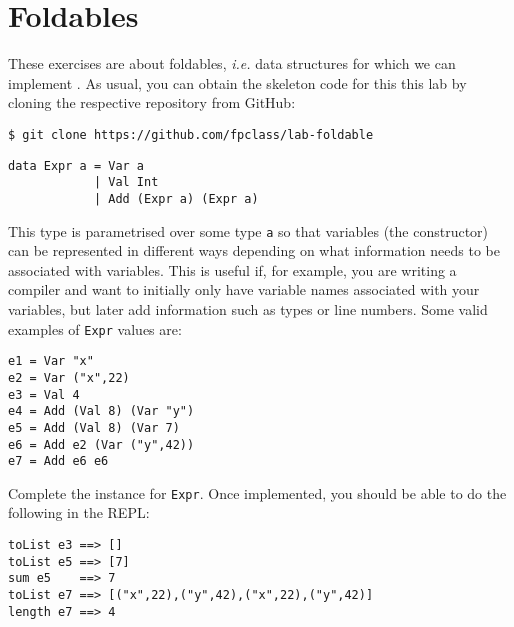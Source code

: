 \section{Foldables}

These exercises are about foldables, \emph{i.e.} data structures for which we can implement . As usual, you can obtain the skeleton code for this this lab by cloning the respective repository from GitHub:
\begin{verbatim}
$ git clone https://github.com/fpclass/lab-foldable
\end{verbatim}

\taskLine 

\begin{verbatim}
data Expr a = Var a
            | Val Int
            | Add (Expr a) (Expr a)
\end{verbatim}
This type is parametrised over some type \texttt{\small a} so that variables (the  constructor) can be represented in different ways depending on what information needs to be associated with variables. This is useful if, for example, you are writing a compiler and want to initially only have variable names associated with your variables, but later add information such as types or line numbers. Some valid examples of \texttt{\small Expr} values are:
\begin{verbatim}
e1 = Var "x"
e2 = Var ("x",22)
e3 = Val 4 
e4 = Add (Val 8) (Var "y")
e5 = Add (Val 8) (Var 7)
e6 = Add e2 (Var ("y",42))
e7 = Add e6 e6
\end{verbatim}
Complete the  instance for \texttt{\small Expr}. Once implemented, you should be able to do the following in the REPL:
\begin{verbatim}
toList e3 ==> []
toList e5 ==> [7]
sum e5    ==> 7
toList e7 ==> [("x",22),("y",42),("x",22),("y",42)]
length e7 ==> 4
\end{verbatim}

\taskLine

